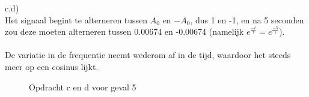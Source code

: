 \documentclass{article}
\begin{document}
c,d)\\
Het signaal begint te alterneren tussen $A_0$ en $-A_0$, dus 1 en -1, en na 5 seconden zou deze moeten alterneren tussen 0.00674 en -0.00674 (namelijk $e^\frac{-t}{\tau} = e^\frac{-5}{1}$).\\
\\
De variatie in de frequentie neemt wederom af in de tijd, waardoor het steeds meer op een cosinus lijkt.
\begin{figure}[h]
  \centering
  \caption{Opdracht c en d voor geval 5}
  \label{fig:case1b}
\end{figure}
\end{document}
